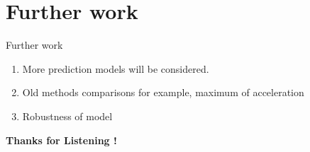 \documentclass{beamer}
\begin{document}
{    
    \section{Further work}
     \begin{frame}{Further work}	
        \begin{enumerate}
        	\item More prediction models will be considered.
        	\item Old methods comparisons for example, maximum of acceleration
        	\item Robustness of model
        \end{enumerate}
    \end{frame}

    \begin{frame}[focus]
        \textbf{Thanks for Listening !}
    \end{frame}
    }
\end{document}

